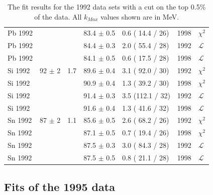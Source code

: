 \begin{table}[h]
\begin{center}
\begin{tabular}{|l||l|l|l|l|l|l|}
      Pb 1992 &                &     & 83.4 $\pm$ 0.5 & 0.6 ( 14.4 / 26) & 1998 & $\chi^2$      \\
      Pb 1992 &                &     & 84.4 $\pm$ 0.3 & 2.0 ( 55.4 / 28) & 1992 & $\mathcal{L}$ \\
      Pb 1992 &                &     & 84.1 $\pm$ 0.5 & 0.6 ( 17.5 / 28) & 1998 & $\mathcal{L}$ \\
      \hline                                                                                    
      Si 1992 & 92   $\pm$ 2   & 1.7 & 89.6 $\pm$ 0.4 & 3.1 ( 92.0 / 30) & 1992 & $\chi^2$      \\
      Si 1992 &                &     & 90.9 $\pm$ 0.4 & 1.3 ( 39.2 / 30) & 1998 & $\chi^2$      \\
      Si 1992 &                &     & 91.4 $\pm$ 0.3 & 3.5 (112.1 / 32) & 1992 & $\mathcal{L}$ \\
      Si 1992 &                &     & 91.6 $\pm$ 0.4 & 1.3 ( 41.6 / 32) & 1998 & $\mathcal{L}$ \\
      \hline                                                                                    
      Sn 1992 & 87   $\pm$ 2   & 1.1 & 85.6 $\pm$ 0.5 & 2.6 ( 68.2 / 26) & 1992 & $\chi^2$      \\
      Sn 1992 &                &     & 87.1 $\pm$ 0.5 & 0.7 ( 19.4 / 26) & 1998 & $\chi^2$      \\
      Sn 1992 &                &     & 87.5 $\pm$ 0.3 & 3.0 ( 84.3 / 28) & 1992 & $\mathcal{L}$ \\
      Sn 1992 &                &     & 87.5 $\pm$ 0.5 & 0.8 ( 21.1 / 28) & 1998 & $\mathcal{L}$ \\
      \hline


    \end{tabular}
  \end{center}
  \caption{The fit results for the 1992 data sets with a cut on the top 0.5\% of the data. All $k_{Max}$ values shown are in MeV.}
  \label{table:fits1992}
\end{table}

\subsection { Fits of the 1995 data }

